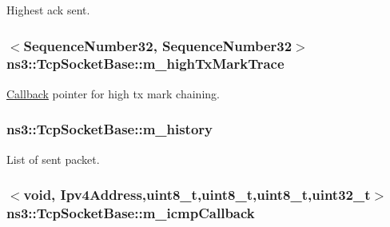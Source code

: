 Highest ack sent. 

\subsubsection[{\texorpdfstring{m\+\_\+high\+Tx\+Mark\+Trace}{m_highTxMarkTrace}}]{$<${\bf Sequence\+Number32}, {\bf Sequence\+Number32}$>$ ns3\+::\+Tcp\+Socket\+Base\+::m\+\_\+high\+Tx\+Mark\+Trace}\hypertarget{classns3_1_1TcpSocketBase_abe31167cc73bc1917e616aa210fa1041}{}\label{classns3_1_1TcpSocketBase_abe31167cc73bc1917e616aa210fa1041}


\hyperlink{classns3_1_1Callback}{Callback} pointer for high tx mark chaining. 

\subsubsection[{\texorpdfstring{m\+\_\+history}{m_history}}]{ ns3\+::\+Tcp\+Socket\+Base\+::m\+\_\+history\hspace{0.3cm}{\ttfamily [protected]}}\hypertarget{classns3_1_1TcpSocketBase_a6d6853c108db3acb5b43ee855bd1f805}{}\label{classns3_1_1TcpSocketBase_a6d6853c108db3acb5b43ee855bd1f805}


List of sent packet. 

\subsubsection[{\texorpdfstring{m\+\_\+icmp\+Callback}{m_icmpCallback}}]{$<$void, {\bf Ipv4\+Address},uint8\+\_\+t,uint8\+\_\+t,uint8\+\_\+t,uint32\+\_\+t$>$ ns3\+::\+Tcp\+Socket\+Base\+::m\+\_\+icmp\+Callback\hspace{0.3cm}{\ttfamily [protected]}}\hypertarget{classns3_1_1TcpSocketBase_aef792b929bd15886a4b9a7132525a0ea}{}\label{classns3_1_1TcpSocketBase_aef792b929bd15886a4b9a7132525a0ea}


